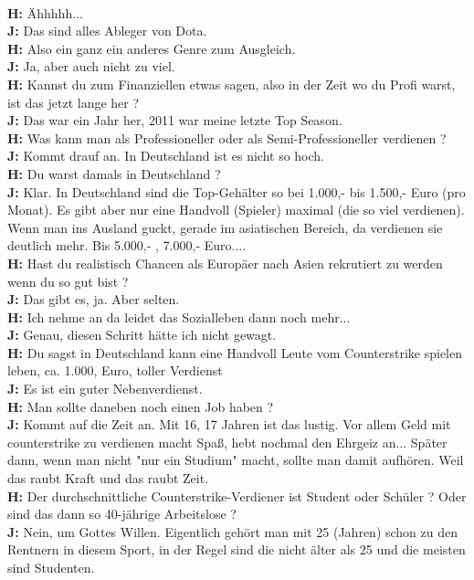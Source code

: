 \\ \textbf{H:} Ähhhhh...
\\ \textbf{J:} Das sind alles Ableger von Dota.
\\ \textbf{H:} Also ein ganz ein anderes Genre zum Ausgleich.
\\ \textbf{J:} Ja, aber auch nicht zu viel.
\\ \textbf{H:} Kannst du zum Finanziellen etwas sagen, also in der Zeit wo du Profi warst, ist das jetzt lange her ?
\\ \textbf{J:} Das war ein Jahr her, 2011 war meine letzte Top Season.
\\ \textbf{H:} Was kann man als Professioneller oder als Semi-Professioneller verdienen ?
\\ \textbf{J:} Kommt drauf an. In Deutschland ist es nicht so hoch.
\\ \textbf{H:} Du warst damals in Deutschland ?
\\ \textbf{J:} Klar. In Deutschland sind die Top-Gehälter so bei 1.000,- bis 1.500,- Euro (pro Monat). Es gibt aber nur eine Handvoll (Spieler) maximal (die so viel verdienen). Wenn man ins Ausland guckt, gerade im asiatischen Bereich, da verdienen sie deutlich mehr. Bis 5.000,- , 7.000,- Euro....
\\ \textbf{H:} Hast du realistisch Chancen als Europäer nach Asien rekrutiert zu werden wenn du so gut bist ?
\\ \textbf{J:} Das gibt es, ja. Aber selten.
\\ \textbf{H:} Ich nehme an da leidet das Sozialleben dann noch mehr...
\\ \textbf{J:} Genau, diesen Schritt hätte ich nicht gewagt.
\\ \textbf{H:} Du sagst in Deutschland kann eine Handvoll Leute vom Counterstrike spielen leben, ca. 1.000, Euro, toller Verdienst
\\ \textbf{J:} Es ist ein guter Nebenverdienst.
\\ \textbf{H:} Man sollte daneben noch einen Job haben ?
\\ \textbf{J:} Kommt auf die Zeit an. Mit 16, 17 Jahren ist das lustig. Vor allem Geld mit counterstrike zu verdienen macht Spaß, hebt nochmal den Ehrgeiz an... Später dann, wenn man nicht "nur ein Studium" macht, sollte man damit aufhören. Weil das raubt Kraft und das raubt Zeit.
\\ \textbf{H:} Der durchschnittliche Counterstrike-Verdiener ist  Student oder Schüler ? Oder sind das dann so 40-jährige Arbeitslose ?
\\ \textbf{J:} Nein, um Gottes Willen. Eigentlich gehört man mit 25 (Jahren) schon zu den Rentnern in diesem Sport, in der Regel sind die nicht älter als 25 und die meisten sind Studenten.
